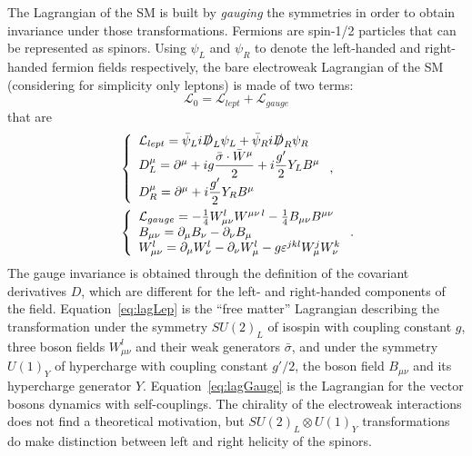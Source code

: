 The Lagrangian of the SM is built by {\it gauging} the symmetries in 
order to obtain invariance under those transformations.
Fermions are spin-1/2 particles that can be represented as spinors.
Using $\psi_{L}$ and 
$\psi_{R}$ to denote the left-handed and right-handed fermion fields 
respectively, 
the bare electroweak Lagrangian of the SM (considering 
for simplicity only leptons) is made of two terms:
\begin{equation}\label{eq:bareLagSM}
\mathcal{L}_{0} = \mathcal{L}_{lept}+ \mathcal{L}_{gauge}
\end{equation}that are \begin{align}
&\left \{ \begin{array}{ll}
\mathcal{L}_{lept} = \bar\psi_{L}i\slashed{D}_{L}\psi_{L} + \bar\psi_{R}i\slashed{D}_{R}\psi_{R}\\
D_{L}^{\mu} = \partial^{\mu} + ig\dfrac{\bar{\sigma}\cdot\bar{W}^{\mu}}{2} + i\dfrac{g'}{2}Y_{L}B^{\mu}\\
D_{R}^{\mu} = \partial^{\mu} + i\dfrac{g'}{2}Y_{R}B^{\mu}
\end{array} \right. ,\label{eq:lagLep} \\
&\left \{ \begin{array}{ll}
\mathcal{L}_{gauge}  = -\frac{1}{4}W_{\mu\nu}^{l}W^{\mu\nu\, l}  -\frac{1}{4}B_{\mu\nu}B^{\mu\nu}\\
B_{\mu\nu} = \partial_{\mu}B_{\nu} - \partial_{\nu}B_{\mu}\\
W_{\mu\nu}^{l} = \partial_{\mu}W_{\nu}^{l} - \partial_{\nu}W_{\mu}^{l} - g\varepsilon^{jkl}W_{\mu}^{j}W_{\nu}^{k}
\end{array} \right. .\label{eq:lagGauge}
\end{align}
The gauge invariance is obtained through the definition of the
covariant derivatives $D$, which are different for the left- and
right-handed components of the field.
Equation~\ref{eq:lagLep} is the ``free matter'' Lagrangian 
describing the transformation under the symmetry $SU(2)_{L}$ of isospin
with coupling constant $g$, three boson fields $W^{l}_{\mu\nu}$ and
their weak generators $\bar{\sigma}$, and under the symmetry
$U(1)_{Y}$ of hypercharge with coupling constant $g'/2$,
the boson field $B_{\mu\nu}$ and its hypercharge generator $Y$.
Equation~\ref{eq:lagGauge} is the Lagrangian for the vector bosons 
dynamics with self-couplings. 
The chirality of the electroweak interactions does not find 
a theoretical motivation, but $SU(2)_{L} \otimes U(1)_{Y}$ transformations 
do make distinction between left and right helicity of the spinors.

